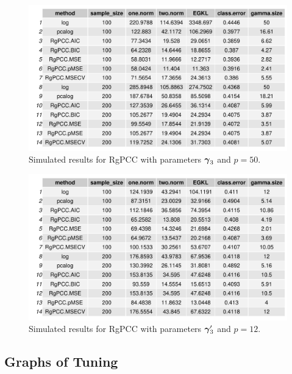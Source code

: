 \documentclass[main.tex]{subfiles}
\begin{document}
\begin{figure}[H]
	\centering
	\includegraphics[width =  \textwidth]{simulated/(sparsity5,50)_metrics.pdf}
	\caption{Simulated results for RgPCC with parameters $\boldsymbol \gamma_3$ and $p = 50$.}
	\label{fig:simulated5-50}
\end{figure}

\begin{figure}[H]
	\centering
	\includegraphics[width =  \textwidth]{simulated/(sparsity5-nonlead,12)_metrics.pdf}
	\caption{Simulated results for RgPCC with parameters $\boldsymbol \gamma_3'$ and $p = 12$.}
	\label{fig:simulated5-12-nonlead}
\end{figure}

\subsection{Graphs of Tuning}
\end{document}
